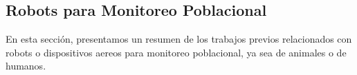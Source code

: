 \subsection{Robots para Monitoreo Poblacional} %
\label{sub:RobotsparaMonitoreoPoblacional}
    En esta secci\'on, presentamos un resumen de los trabajos previos relacionados con robots o dispositivos aereos 
        para monitoreo poblacional, ya sea de animales o de humanos. 
    
    
    
